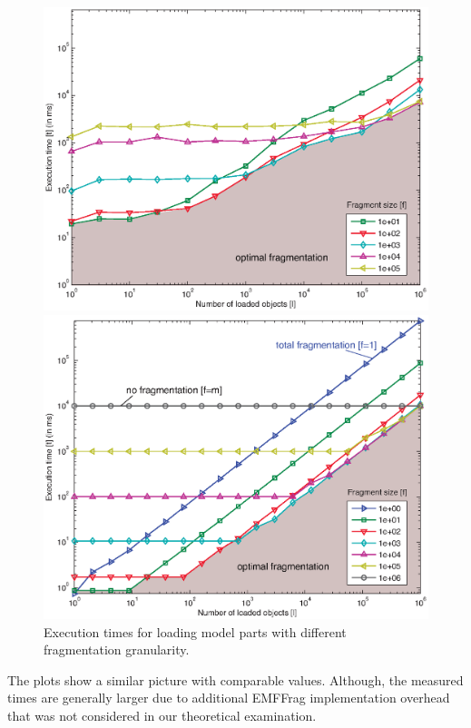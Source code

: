 \begin{figure}[b]
\begin{minipage}[b]{0.48\linewidth}
\centering
\includegraphics[width=\linewidth]{figures/measureTimesExtra}
\end{minipage}
\hspace{0.02\linewidth}
\begin{minipage}[b]{0.48\linewidth}
\centering
\includegraphics[width=\linewidth]{figures/theoryTimesSmallWO}
\end{minipage}
\caption{Execution times for loading model parts with different fragmentation granularity.}
\label{fig:measureTimeExtra}
\end{figure}
%

The plots show a similar picture with comparable values. Although, the measured times are generally larger due to additional EMFFrag implementation overhead that was not considered in our theoretical examination.